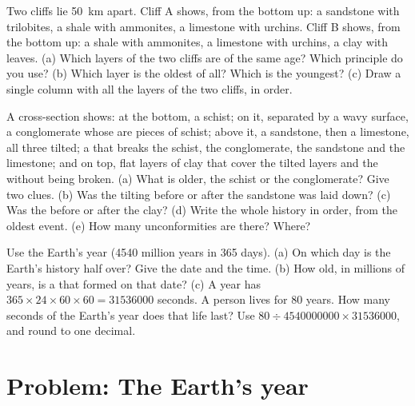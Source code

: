 \begin{exercise}[$\star\star$]\label{exo:g7:geological-time:10}
Two cliffs lie \qty{50}{km} apart. Cliff A shows, from the bottom up: a
sandstone with trilobites, a shale with ammonites, a limestone with 
urchins. Cliff B shows, from the bottom up: a shale with ammonites, a
limestone with  urchins, a clay with leaves. (a) Which layers of the
two cliffs are of the same age? Which principle do you use? (b) Which
layer is the oldest of all? Which is the youngest? (c) Draw a single
column with all the layers of the two cliffs, in order.
\end{exercise}

\begin{exercise}[$\star\star\star$]\label{exo:g7:geological-time:11}
A cross-section shows: at the bottom, a schist; on it, separated by a
wavy  surface, a conglomerate whose  are pieces of schist;
above it, a sandstone, then a limestone, all three tilted; a  that
breaks the schist, the conglomerate, the sandstone and the limestone;
and on top, flat layers of clay that cover the tilted layers and the
 without being broken. (a) What is older, the schist or the
conglomerate? Give two clues. (b) Was the tilting before or after the
sandstone was laid down? (c) Was the  before or after the clay?
(d) Write the whole history in order, from the oldest event. (e) How
many unconformities are there? Where?
\end{exercise}

\begin{exercise}[$\star\star\star$]\label{exo:g7:geological-time:12}
Use the Earth's year (\num{4540} million years in 365 days). (a) On which
day is the Earth's history half over? Give the date and the time.
(b) How old, in millions of years, is a  that formed on that date?
(c) A year has $365 \times 24 \times 60 \times 60 = \num{31536000}$
seconds. A person lives for 80 years. How many seconds of the Earth's
year does that life last? Use $80 \div \num{4540000000} \times
\num{31536000}$, and round to one decimal.
\end{exercise}

\section{Problem: The Earth's year}


